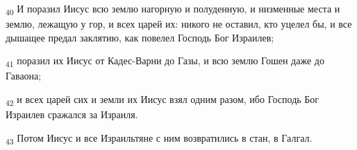 \begin{tcolorbox}
\textsubscript{40} И поразил Иисус всю землю нагорную и полуденную, и низменные места и землю, лежащую у гор, и всех царей их: никого не оставил, кто уцелел бы, и все дышащее предал заклятию, как повелел Господь Бог Израилев;
\end{tcolorbox}
\begin{tcolorbox}
\textsubscript{41} поразил их Иисус от Кадес-Варни до Газы, и всю землю Гошен даже до Гаваона;
\end{tcolorbox}
\begin{tcolorbox}
\textsubscript{42} и всех царей сих и земли их Иисус взял одним разом, ибо Господь Бог Израилев сражался за Израиля.
\end{tcolorbox}
\begin{tcolorbox}
\textsubscript{43} Потом Иисус и все Израильтяне с ним возвратились в стан, в Галгал.
\end{tcolorbox}
